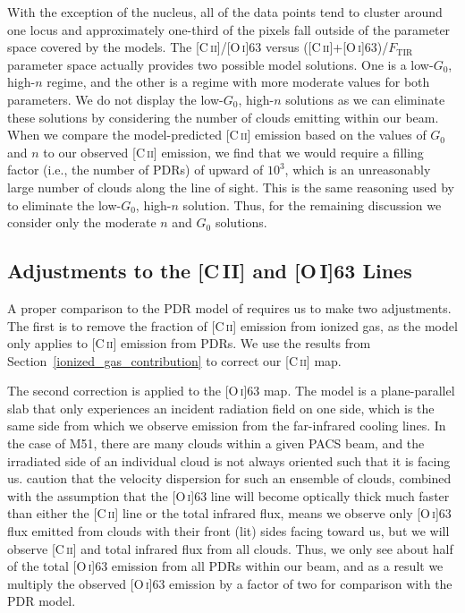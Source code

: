 With the exception of the nucleus, all of the data points tend to cluster around one locus and approximately one-third of the pixels fall outside of the parameter space covered by the models.  The [C\,\textsc{ii}]/[O\,\textsc{i}]63 versus ([C\,\textsc{ii}]+[O\,\textsc{i}]63)/$F_{\mathrm{TIR}}$ parameter space actually provides two possible model solutions.  One is a low-$G_0$, high-$n$ regime, and the other is a regime with more moderate values for both parameters.  We do not display the low-$G_0$, high-$n$ solutions as we can eliminate these solutions by considering the number of clouds emitting within our beam.  When we compare the model-predicted [C\,\textsc{ii}] emission based on the values of $G_0$ and $n$ to our observed [C\,\textsc{ii}] emission, we find that we would require a filling factor (i.e., the number of PDRs) of upward of $10^{3}$, which is an unreasonably large number of clouds along the line of sight.  This is the same reasoning used by \citet{2005A&A...441..961K} to eliminate the low-$G_0$, high-$n$ solution.  Thus, for the remaining discussion we consider only the moderate $n$ and $G_{0}$ solutions.

\subsection{Adjustments to the [C\,{\footnotesize II}] and [O\,{\footnotesize I}]63 Lines}\label{pdr_model_adjustments}
A proper comparison to the PDR model of \citet{1999ApJ...527..795K} requires us to make two adjustments.  The first is to remove the fraction of [C\,\textsc{ii}] emission from ionized gas, as the model only applies to [C\,\textsc{ii}] emission from PDRs.  We use the results from Section~\ref{ionized_gas_contribution} to correct our [C\,\textsc{ii}] map.

The second correction is applied to the [O\,\textsc{i}]63 map.  The \citet{1999ApJ...527..795K} model is a plane-parallel slab that only experiences an incident radiation field on one side, which is the same side from which we observe emission from the far-infrared cooling lines.  In the case of M51, there are many clouds within a given PACS beam, and the irradiated side of an individual cloud is not always oriented such that it is facing us.  \citet{1999ApJ...527..795K} caution that the velocity dispersion for such an ensemble of clouds, combined with the assumption that the [O\,\textsc{i}]63 line will become optically thick much faster than either the [C\,\textsc{ii}] line or the total infrared flux, means we observe only [O\,\textsc{i}]63 flux emitted from clouds with their front (lit) sides facing toward us, but we will observe [C\,\textsc{ii}] and total infrared flux from all clouds.  Thus, we only see about half of the total [O\,\textsc{i}]63 emission from all PDRs within our beam, and as a result we multiply the observed [O\,\textsc{i}]63 emission by a factor of two for comparison with the PDR model.

